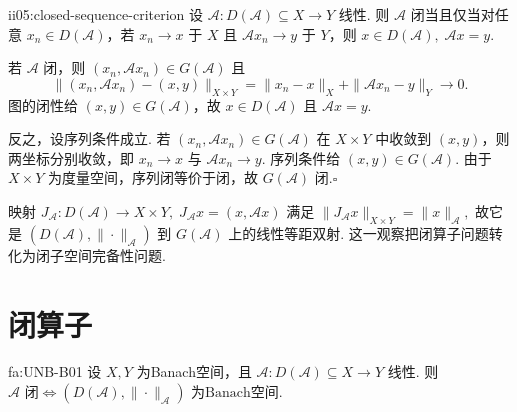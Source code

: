 \begin{FAProposition}[C][闭算子的序列判据]{ii05:closed-sequence-criterion}
设 \(\displaystyle\mathcal A:D(\mathcal A)\subseteq X\to Y\) 线性. 则 \(\displaystyle\mathcal A\) 闭当且仅当对任意 \(\displaystyle x_n\in D(\mathcal A)\)，若 \(\displaystyle x_n\to x\) 于 \(\displaystyle X\) 且 \(\displaystyle\mathcal Ax_n\to y\) 于 \(\displaystyle Y\)，则
\(\displaystyle x\in D(\mathcal A), \; \mathcal Ax=y.\)
\end{FAProposition}

\begin{FAProof}
若 \(\displaystyle\mathcal A\) 闭，则 \(\displaystyle(x_n,\mathcal Ax_n)\in G(\mathcal A)\) 且
\[
\|(x_n,\mathcal Ax_n)-(x,y)\|_{X\times Y}
=
\|x_n-x\|_X+\|\mathcal Ax_n-y\|_Y
\longrightarrow0.
\]
图的闭性给 \(\displaystyle(x,y)\in G(\mathcal A)\)，故 \(\displaystyle x\in D(\mathcal A)\) 且 \(\displaystyle\mathcal Ax=y\).

反之，设序列条件成立. 若 \(\displaystyle(x_n,\mathcal Ax_n)\in G(\mathcal A)\) 在 \(\displaystyle X\times Y\) 中收敛到 \(\displaystyle(x,y)\)，则两坐标分别收敛，即 \(\displaystyle x_n\to x\) 与 \(\displaystyle\mathcal Ax_n\to y\). 序列条件给 \(\displaystyle(x,y)\in G(\mathcal A)\). 由于 \(\displaystyle X\times Y\) 为度量空间，序列闭等价于闭，故 \(\displaystyle G(\mathcal A)\) 闭.\hfill\(\square\)
\end{FAProof}

映射
\(\displaystyle J_{\mathcal A}:D(\mathcal A)\to X\times Y, \; J_{\mathcal A}x=(x,\mathcal Ax)\)
满足
\(\displaystyle \|J_{\mathcal A}x\|_{X\times Y}=\|x\|_{\mathcal A},\)
故它是 \(\displaystyle(D(\mathcal A),\|\cdot\|_{\mathcal A})\) 到 \(\displaystyle G(\mathcal A)\) 上的线性等距双射. 这一观察把闭算子问题转化为闭子空间完备性问题.

\section{闭算子}\label{sec:ii05-closed-operators}

\begin{FATheorem}[B][闭性与图范数完备性]{fa:UNB-B01}
设 \(\displaystyle X,Y\) 为Banach空间，且 \(\displaystyle\mathcal A:D(\mathcal A)\subseteq X\to Y\) 线性. 则
\(\displaystyle \mathcal A\text{ 闭} \iff (D(\mathcal A),\|\cdot\|_{\mathcal A})\text{ 为Banach空间}.\)
\end{FATheorem}

